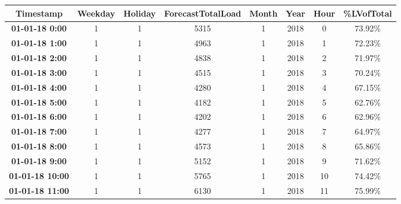 \begin{table}[h!]
\begin{tabular}{|c|c|c|c|c|c|c|c|}
\hline
\textbf{Timestamp}               & \textbf{Weekday} & \textbf{Holiday} & \textbf{ForecastTotalLoad} & \textbf{Month} & \textbf{Year} & \textbf{Hour} & \textbf{\%LVofTotal} \\ \hline
\textbf{01-01-18 0:00}  & 1                & 1                & 5315                       & 1              & 2018          & 0             & 73.92\%              \\ \hline
\textbf{01-01-18 1:00}  & 1                & 1                & 4963                       & 1              & 2018          & 1             & 72.23\%              \\ \hline
\textbf{01-01-18 2:00}  & 1                & 1                & 4838                       & 1              & 2018          & 2             & 71.97\%              \\ \hline
\textbf{01-01-18 3:00}  & 1                & 1                & 4515                       & 1              & 2018          & 3             & 70.24\%              \\ \hline
\textbf{01-01-18 4:00}  & 1                & 1                & 4280                       & 1              & 2018          & 4             & 67.15\%              \\ \hline
\textbf{01-01-18 5:00}  & 1                & 1                & 4182                       & 1              & 2018          & 5             & 62.76\%              \\ \hline
\textbf{01-01-18 6:00}  & 1                & 1                & 4202                       & 1              & 2018          & 6             & 62.96\%              \\ \hline
\textbf{01-01-18 7:00}  & 1                & 1                & 4277                       & 1              & 2018          & 7             & 64.97\%              \\ \hline
\textbf{01-01-18 8:00}  & 1                & 1                & 4573                       & 1              & 2018          & 8             & 65.86\%              \\ \hline
\textbf{01-01-18 9:00}  & 1                & 1                & 5152                       & 1              & 2018          & 9             & 71.62\%              \\ \hline
\textbf{01-01-18 10:00} & 1                & 1                & 5765                       & 1              & 2018          & 10            & 74.42\%              \\ \hline
\textbf{01-01-18 11:00} & 1                & 1                & 6130                       & 1              & 2018          & 11            & 75.99\%              \\ \hline
\end{tabular}
\end{table}

